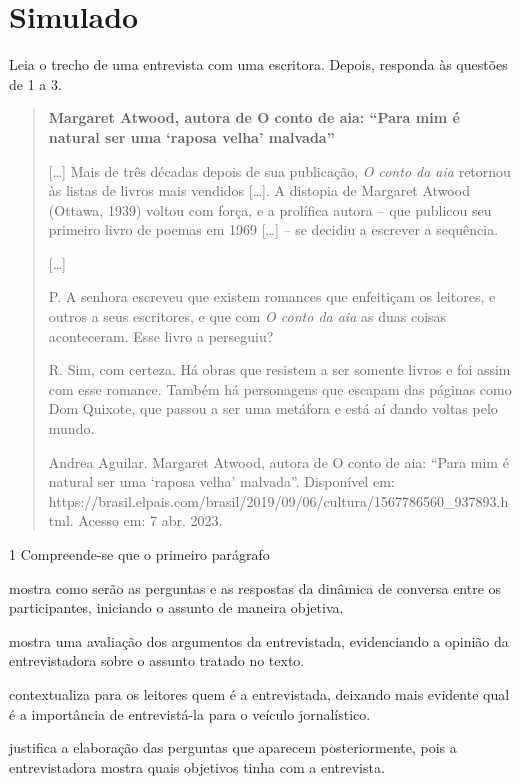 \chapter[Simulado 2]{Simulado}

Leia o trecho de uma entrevista com uma escritora. Depois, responda às
questões de 1 a 3.

\begin{quote}
\textbf{Margaret Atwood, autora de O conto de aia: ``Para mim é natural
ser uma `raposa velha' malvada''}

{[}\ldots{}{]} Mais de três décadas depois de sua publicação, \emph{O
conto da aia} retornou às listas de livros mais vendidos {[}\ldots{}{]}.
A distopia de Margaret Atwood (Ottawa, 1939) voltou com força, e a
prolífica autora -- que publicou seu primeiro livro de poemas em 1969
{[}\ldots{}{]} -- se decidiu a escrever a sequência.

{[}\ldots{}{]}

P. A senhora escreveu que existem romances que enfeitiçam os leitores, e
outros a seus escritores, e que com \emph{O conto da aia} as duas coisas
aconteceram. Esse livro a perseguiu?

R. Sim, com certeza. Há obras que resistem a ser somente livros e foi
assim com esse romance. Também há personagens que escapam das páginas
como Dom Quixote, que passou a ser uma metáfora e está aí dando voltas
pelo mundo.

Andrea Aguilar. Margaret Atwood, autora de O conto de aia: ``Para mim é
natural ser uma `raposa velha' malvada''. Disponível em:
https://brasil.elpais.com/brasil/2019/09/06/cultura/1567786560\_937893.html.
Acesso em: 7 abr. 2023.
\end{quote}

\num{1} Compreende-se que o primeiro parágrafo

\begin{escolha}
\item mostra como serão as perguntas e as respostas da dinâmica de
conversa entre os participantes, iniciando o assunto de maneira
objetiva.

\item mostra uma avaliação dos argumentos da entrevistada, evidenciando a
opinião da entrevistadora sobre o assunto tratado no texto.

\item contextualiza para os leitores quem é a entrevistada, deixando mais
evidente qual é a importância de entrevistá-la para o veículo
jornalístico.

\item justifica a elaboração das perguntas que aparecem posteriormente,
pois a entrevistadora mostra quais objetivos tinha com a entrevista.
\end{escolha}

